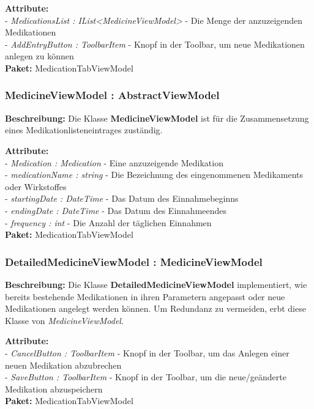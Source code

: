 \documentclass[a4paper]{scrreprt}
\begin{document}
\textbf{Attribute:}\\
- \textit{MedicationsList : IList<MedicineViewModel>} - Die Menge der anzuzeigenden Medikationen\\
- \textit{AddEntryButton : ToolbarItem} - Knopf in der Toolbar, um neue Medikationen anlegen zu können\\

\textbf{Paket:} MedicationTabViewModel

\subsubsection{MedicineViewModel : AbstractViewModel}
\textbf{Beschreibung:} Die Klasse \textbf{MedicineViewModel} ist für die Zusammensetzung eines Medikationlisteneintrages zuständig.

\textbf{Attribute:}\\
- \textit{Medication : Medication} - Eine anzuzeigende Medikation\\
- \textit{medicationName : string} - Die Bezeichnung des eingenommenen Medikaments oder Wirkstoffes\\
- \textit{startingDate : DateTime} - Das Datum des Einnahmebeginns\\
- \textit{endingDate : DateTime} - Das Datum des Einnahmeendes\\
- \textit{frequency : int} - Die Anzahl der täglichen Einnahmen\\

\textbf{Paket:} MedicationTabViewModel

\subsubsection{DetailedMedicineViewModel : MedicineViewModel}
\textbf{Beschreibung:} Die Klasse \textbf{DetailedMedicineViewModel} implementiert, wie bereits bestehende Medikationen in ihren Parametern angepasst oder neue Medikationen angelegt werden können. Um Redundanz zu vermeiden, erbt diese Klasse von \textit{MedicineViewModel}.

\textbf{Attribute:}\\
- \textit{CancelButton : ToolbarItem} - Knopf in der Toolbar, um das Anlegen einer neuen Medikation abzubrechen\\
- \textit{SaveButton : ToolbarItem} - Knopf in der Toolbar, um die neue/geänderte Medikation abzuspeichern\\

\textbf{Paket:} MedicationTabViewModel
\end{document}
